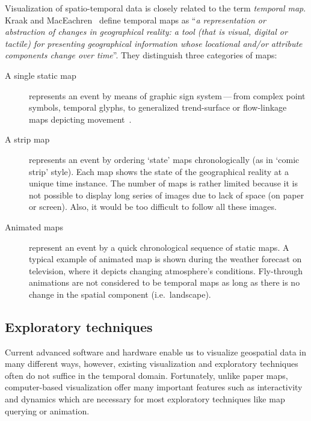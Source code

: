 \documentclass[a4paper,12pt,oneside]{book}
\newcommand{\dash}{\mbox{\,---\,}}
\begin{document}
Visualization of spatio-temporal data is closely related to the term \emph{temporal map}.
Kraak and MacEachren~\cite{kraak1994visualization} define temporal maps as
``\emph{a representation or abstraction of changes in geographical reality:
a tool (that is visual, digital or tactile) for presenting geographical information
whose locational and/or attribute components change over time}''.
They distinguish three categories of maps:
    \begin{description}
        \item[A single static map] represents an event by means of graphic sign system\dash from complex point symbols,
            temporal glyphs, to generalized trend-surface or flow-linkage maps depicting movement~\cite{monmonier1990strategies}.

        \item[A strip map] represents an event by ordering `state' maps chronologically (as in `comic strip' style).
            Each map shows the state of the geographical reality at a unique time instance.
            The number of maps is rather limited because it is not possible to display long series of images
            due to lack of space (on paper or screen). Also, it would be too difficult to follow all these images.

        \item[Animated maps] represent an event by a quick chronological sequence of static maps.
            A typical example of animated map is shown during the weather forecast on television,
            where it depicts changing atmosphere's conditions.
            Fly-through animations are not considered to be temporal maps
            as long as there is no change in the spatial component (i.e.\ landscape).
    \end{description}



\subsection{Exploratory techniques}
\label{sec:exploratoryTechniques}
Current advanced software and hardware enable us to visualize geospatial data in many different ways,
however, existing visualization and exploratory techniques often do not suffice in the temporal domain.
Fortunately, unlike paper maps, computer-based visualization offer many important features
such as interactivity and dynamics which are necessary for most exploratory techniques
like map querying or animation.
\end{document}
